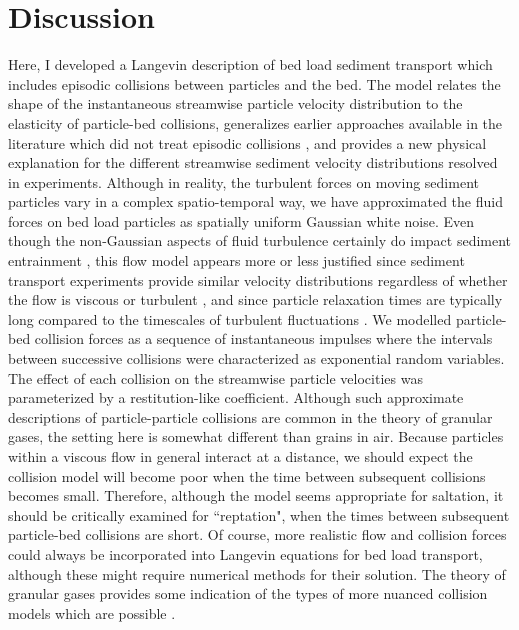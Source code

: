 \section{Discussion}
\label{sec:discussion}

Here, I developed a Langevin description of bed load sediment transport which includes episodic collisions between particles and the bed.
The model relates the shape of the instantaneous streamwise particle velocity distribution to the elasticity of particle-bed collisions,
generalizes earlier approaches available in the literature which did not treat episodic collisions \citep{Ancey2014,Fan2014}, and provides a new physical explanation for the different streamwise sediment velocity distributions resolved in experiments.
Although in reality, the turbulent forces on moving sediment particles vary in a complex spatio-temporal way, we have approximated the fluid forces on bed load particles as spatially uniform Gaussian white noise. Even though the non-Gaussian aspects of fluid turbulence certainly do impact sediment entrainment \citep{Cameron2020,Celik2014}, this flow model appears more or less justified since sediment transport experiments provide similar velocity distributions regardless of whether the flow is viscous or turbulent \citep{Lajeunesse2010, Charru2004}, and since particle relaxation times are typically long compared to the timescales of turbulent fluctuations \citep{Hofland2006,Schmeeckle2007,Nakagawa1981}.
We modelled particle-bed collision forces as a sequence of instantaneous impulses where the intervals between successive collisions were characterized as exponential random variables. The effect of each collision on the streamwise particle velocities was parameterized by a restitution-like coefficient.
Although such approximate descriptions of particle-particle collisions are common in the theory of granular gases, the setting here is somewhat different than grains in air. Because particles within a viscous flow in general interact at a distance, we should expect the collision model will become poor when the time between subsequent collisions becomes small. Therefore, although the model seems appropriate for saltation, it should be critically examined for ``reptation", when the times between subsequent particle-bed collisions are short. Of course, more realistic flow and collision forces could always be incorporated into Langevin equations for bed load transport, although these might require numerical methods for their solution. The theory of granular gases provides some indication of the types of more nuanced collision models which are possible \citep{Brilliantov2004}.

